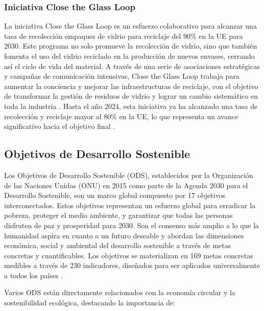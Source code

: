 \documentclass[main.tex]{subfiles}
\begin{document}
\subsubsection{Iniciativa Close the Glass Loop}
La iniciativa Close the Glass Loop es un esfuerzo colaborativo para alcanzar una tasa de recolección empaques de vidrio para reciclaje del 90\% en la UE para 2030. Este programa no solo promueve la recolección de vidrio, sino que también fomenta el uso del vidrio reciclado en la producción de nuevos envases, cerrando así el ciclo de vida del material. A través de una serie de asociaciones estratégicas y campañas de comunicación intensivas, Close the Glass Loop trabaja para aumentar la conciencia y mejorar las infraestructuras de reciclaje, con el objetivo de transformar la gestión de residuos de vidrio y lograr un cambio sistemático en toda la industria \cite{closetheglassloop2023}. Hasta el año 2024, esta iniciativa ya ha alcanzado una tasa de recolección y reciclaje mayor al 80\% en la UE, lo que representa un avance significativo hacia el objetivo final \cite{closetheglassloop2023}.

\subsection{Objetivos de Desarrollo Sostenible}
Los Objetivos de Desarrollo Sostenible (ODS), establecidos por la Organización de las Naciones Unidas (ONU) en 2015 como parte de la Agenda 2030 para el Desarrollo Sostenible, son un marco global compuesto por 17 objetivos interconectados. Estos objetivos representan un esfuerzo global para erradicar la pobreza, proteger el medio ambiente, y garantizar que todas las personas disfruten de paz y prosperidad para 2030. Son el consenso más amplio a lo que la humanidad aspira en cuanto a un futuro deseable y abordan las dimensiones económica, social y ambiental del desarrollo sostenible a través de metas concretas y cuantificables. Los objetivos se materializan en 169 metas concretas medibles a través de 230 indicadores, diseñados para ser aplicados universalmente a todos los países  \cite{onu2024ods gil2018objetivos}.

Varios ODS están directamente relacionados con la economía circular y la sostenibilidad ecológica, destacando la importancia de:
\end{document}
